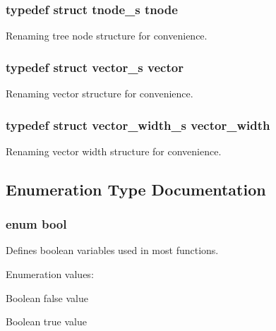 \subsubsection{\setlength{\rightskip}{0pt plus 5cm}typedef struct {\bf tnode\_\-s} {\bf tnode}}\label{defines_8h_a178}


Renaming tree node structure for convenience. 
\subsubsection{\setlength{\rightskip}{0pt plus 5cm}typedef struct {\bf vector\_\-s} {\bf vector}}\label{defines_8h_a157}


Renaming vector structure for convenience. 
\subsubsection{\setlength{\rightskip}{0pt plus 5cm}typedef struct {\bf vector\_\-width\_\-s} {\bf vector\_\-width}}\label{defines_8h_a174}


Renaming vector width structure for convenience. 

\subsection{Enumeration Type Documentation}
\subsubsection{\setlength{\rightskip}{0pt plus 5cm}enum {\bf bool}}\label{defines_8h_a181}


Defines boolean variables used in most functions. \begin{Desc}
\item[Enumeration values: ]\par
\begin{description}
\item[{\em 
{\em FALSE}\label{defines_8h_a181a179}
}]Boolean false value \item[{\em 
{\em TRUE}\label{defines_8h_a181a180}
}]Boolean true value \end{description}
\end{Desc}

